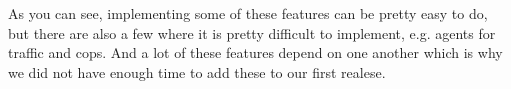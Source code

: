 As you can see, implementing some of these features can be pretty easy to do, but there are also a few where it is pretty difficult to implement, e.g. agents for traffic and cops. And a lot of these features depend on one another which is why we did not have enough time to add these to our first realese.



